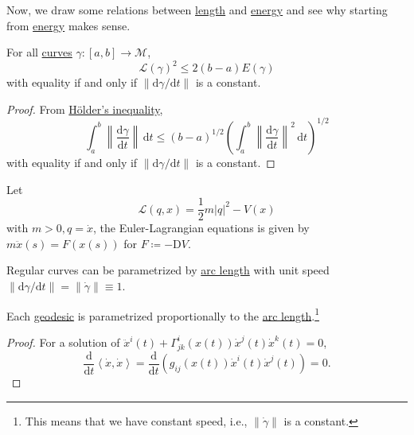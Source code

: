 Now, we draw some relations between \hyperref[def:length]{length} and \hyperref[def:energy]{energy} and see why starting from \hyperref[def:energy]{energy} makes sense.

\begin{proposition}
	For all \hyperref[def:curve]{curves} \(\gamma \colon [a, b] \to \mathcal{M} \),
	\[
		\mathcal{L} (\gamma )^2 \leq 2(b-a) E(\gamma )
	\]
	with equality if and only if \(\lVert \mathrm{d} \gamma / \mathrm{d} t \rVert \) is a constant.
\end{proposition}
\begin{proof}
	From \href{https://en.wikipedia.org/wiki/H%C3%B6lder%27s_inequality}{Hölder's inequality},
	\[
		\int_{a}^{b} \left\lVert \frac{\mathrm{d}\gamma }{\mathrm{d}t} \right\rVert \,\mathrm{d}t
		\leq (b-a)^{1 / 2} \left( \int_{a}^{b} \left\lVert \frac{\mathrm{d}\gamma }{\mathrm{d}t} \right\rVert ^2 \,\mathrm{d}t \right) ^{1 / 2}
	\]
	with equality if and only if \(\lVert \mathrm{d} \gamma / \mathrm{d} t \rVert\) is a constant.
\end{proof}

\begin{eg}
	Let
	\[
		\mathcal{L} (q, x) = \frac{1}{2} m \vert q \vert ^2 - V(x)
	\]
	with \(m > 0, q = \dot{x}\), the Euler-Lagrangian equations is given by \(m\ddot{x} (s) = F(x(s))\) for \(F\coloneqq -\mathrm{D} V\).
\end{eg}

\begin{prev}
	Regular curves can be parametrized by \hyperref[def:length]{arc length} with unit speed \(\lVert \mathrm{d} \gamma / \mathrm{d} t \rVert = \lVert \dot{\gamma } \rVert \equiv 1\).
\end{prev}

\begin{lemma}
	Each \hyperref[def:geodesic]{geodesic} is parametrized proportionally to the \hyperref[def:length]{arc length}.\footnote{This means that we have constant speed, i.e., \(\lVert \dot{\gamma } \rVert \) is a constant.}
\end{lemma}
\begin{proof}
	For a solution of \(\ddot{x}^i(t) + \Gamma ^{i}_{jk}(x(t)) \dot{x}^j(t)\dot{x}^k(t) = 0\),
	\[
		\frac{\mathrm{d}}{\mathrm{d}t} \left\langle \dot{x}, \dot{x} \right\rangle
		= \frac{\mathrm{d}}{\mathrm{d}t} \left( g_{ij} (x(t)) \dot{x}^i(t)\dot{x}^j(t)\right)
		=0.
	\]
\end{proof}


